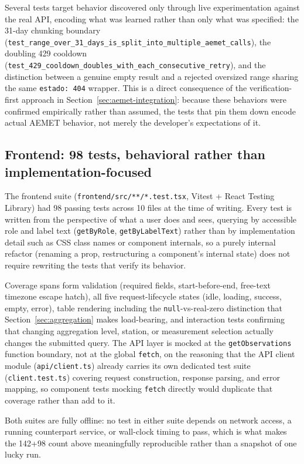 \documentclass[11pt,a4paper]{article}
\begin{document}
Several tests target behavior discovered only through live experimentation
against the real API, encoding what was learned rather than only what was
specified: the 31-day chunking boundary
(\texttt{test\_range\_over\_31\_days\_is\_split\_into\_multiple\_aemet\_calls}),
the doubling 429 cooldown
(\texttt{test\_429\_cooldown\_doubles\_with\_each\_consecutive\_retry}),
and the distinction between a genuine empty result and a rejected
oversized range sharing the same \texttt{estado: 404} wrapper. This is a
direct consequence of the verification-first approach in
Section~\ref{sec:aemet-integration}: because these behaviors were confirmed
empirically rather than assumed, the tests that pin them down encode actual
AEMET behavior, not merely the developer's expectations of it.

\subsection{Frontend: 98 tests, behavioral rather than implementation-focused}

The frontend suite (\texttt{frontend/src/**/*.test.tsx}, Vitest + React
Testing Library) had 98 passing tests across 10 files at the time of
writing. Every test is written from the perspective of what a user does
and sees, querying by accessible role and label text
(\texttt{getByRole}, \texttt{getByLabelText}) rather than by
implementation detail such as CSS class names or component internals, so a
purely internal refactor (renaming a prop, restructuring a component's
internal state) does not require rewriting the tests that verify its
behavior.

Coverage spans form validation (required fields, start-before-end,
free-text timezone escape hatch), all five request-lifecycle states
(idle, loading, success, empty, error), table rendering including the
\texttt{null}-vs-real-zero distinction that Section~\ref{sec:aggregation}
makes load-bearing, and interaction tests confirming that changing
aggregation level, station, or measurement selection actually changes the
submitted query. The API layer is mocked at the \texttt{getObservations}
function boundary, not at the global \texttt{fetch}, on the reasoning that
the API client module (\texttt{api/client.ts}) already carries its own
dedicated test suite (\texttt{client.test.ts}) covering request
construction, response parsing, and error mapping, so component tests
mocking \texttt{fetch} directly would duplicate that coverage rather than
add to it.

Both suites are fully offline: no test in either suite depends on network
access, a running counterpart service, or wall-clock timing to pass, which
is what makes the 142+98 count above meaningfully reproducible rather than
a snapshot of one lucky run.
\end{document}
